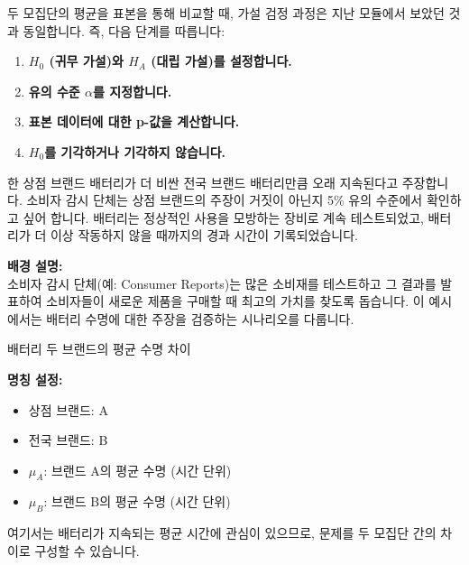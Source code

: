 \documentclass[11pt,a4paper]{article}
\theoremstyle{definition}
\begin{document}
\begin{infobox}[title=두 평균에 대한 가설 검정 절차]
두 모집단의 평균을 표본을 통해 비교할 때, 가설 검정 과정은 지난 모듈에서 보았던 것과 동일합니다. 즉, 다음 단계를 따릅니다:
\begin{enumerate}
    \item \textbf{$H_0$ (귀무 가설)와 $H_A$ (대립 가설)를 설정합니다.}
    \item \textbf{유의 수준 $\alpha$를 지정합니다.}
    \item \textbf{표본 데이터에 대한 p-값을 계산합니다.}
    \item \textbf{$H_0$를 기각하거나 기각하지 않습니다.}
\end{enumerate}
\end{infobox}

\begin{examplebox}[title=예시 1: 배터리 수명 비교 - 문제 정의]
한 상점 브랜드 배터리가 더 비싼 전국 브랜드 배터리만큼 오래 지속된다고 주장합니다. 소비자 감시 단체는 상점 브랜드의 주장이 거짓이 아닌지 5\% 유의 수준에서 확인하고 싶어 합니다. 배터리는 정상적인 사용을 모방하는 장비로 계속 테스트되었고, 배터리가 더 이상 작동하지 않을 때까지의 경과 시간이 기록되었습니다.

\textbf{배경 설명:} \\
소비자 감시 단체(예: Consumer Reports)는 많은 소비재를 테스트하고 그 결과를 발표하여 소비자들이 새로운 제품을 구매할 때 최고의 가치를 찾도록 돕습니다. 이 예시에서는 배터리 수명에 대한 주장을 검증하는 시나리오를 다룹니다.
\end{examplebox}

\begin{infobox}[title=두 브랜드 비교 (1/8): 문제 정의 및 변수 설정]
배터리 두 브랜드의 평균 수명 차이

\textbf{명칭 설정:}
\begin{itemize}
    \item 상점 브랜드: A
    \item 전국 브랜드: B
    \item $\mu_A$: 브랜드 A의 평균 수명 (시간 단위)
    \item $\mu_B$: 브랜드 B의 평균 수명 (시간 단위)
\end{itemize}
여기서는 배터리가 지속되는 평균 시간에 관심이 있으므로, 문제를 두 모집단 간의 차이로 구성할 수 있습니다.
\end{infobox}
\end{document}
